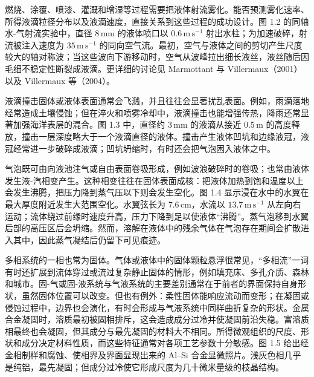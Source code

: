 \documentclass[11pt,a4paper,openany,fontset=none]{ctexbook}
\newenvironment{sourceblock}
  {\par\addvspace{0.65\baselineskip}\noindent\begin{minipage}{\linewidth}\centering}
  {\end{minipage}\par\addvspace{0.48\baselineskip}}
\begin{document}
燃烧、涂覆、喷漆、灌溉和增湿等过程需要把液体射流雾化。能否预测雾化速率、所得液滴粒径分布以及液滴速度，直接关系到这些过程的成功设计。图 1.2 的同轴水-气射流实验中，直径 $8\,\mathrm{mm}$ 的液体喷口以 $0.6\,\mathrm{m\,s^{-1}}$ 射出水柱；为加速破碎，射流被注入速度为 $35\,\mathrm{m\,s^{-1}}$ 的同向空气流。最初，空气与液体之间的剪切产生尺度较大的轴对称波；当这些波向下游移动时，空气从波峰拉出细长液丝，液丝随后因毛细不稳定性断裂成液滴。更详细的讨论见 Marmottant 与 Villermaux（2001）以及 Villermaux 等（2004）。

\begin{sourceblock}
\end{sourceblock}

液滴撞击固体或液体表面通常会飞溅，并且往往会显著扰乱表面。例如，雨滴落地经常造成土壤侵蚀；但在淬火和喷雾冷却中，液滴撞击也能增强传热，降雨还常显著加强海洋表层的混合。图 1.3 中，直径约 $3\,\mathrm{mm}$ 的液滴从接近 $0.5\,\mathrm{m}$ 的高度释放，撞击一层深度略大于一个液滴直径的液体。撞击产生液体凹坑和边缘液冠，液冠经常进一步破碎成液滴；凹坑坍缩时，有时还会把气泡困入液体之中。

\begin{sourceblock}
\end{sourceblock}

气泡既可由向液池注气或自由表面卷吸形成，例如波浪破碎时的卷吸；也常由液体发生液-汽相变产生。这种相变往往在固体表面成核：把液体加热到饱和温度以上会发生沸腾，把压力降到蒸气压以下则会发生空化。图 1.4 显示浸在水中的水翼在最大厚度附近发生大范围空化。水翼弦长为 $7.6\,\mathrm{cm}$，水流以 $13.7\,\mathrm{m\,s^{-1}}$ 从左向右运动；流体绕过前缘时速度升高，压力下降到足以使液体“沸腾”。蒸气泡移到水翼后部的高压区后会坍缩。然而，溶解在液体中的残余气体在气泡存在期间会扩散进入其中，因此蒸气凝结后仍留下可见痕迹。

\begin{sourceblock}
\end{sourceblock}

多相系统的一相也常为固体。气体或液体中的固体颗粒悬浮很常见，“多相流”一词有时还扩展到流体穿过或流过复杂静止固体的情形，例如填充床、多孔介质、森林和城市。固-气或固-液系统与气液系统的主要差别通常在于前者的界面保持自身形状，虽然固体位置可以改变。但也有例外：柔性固体能响应流动而变形；在凝固或侵蚀过程中，边界也会演化，有时会形成与气液系统中同样曲折复杂的形状。金属合金凝固时，溶质最初被固相排斥，这会造成成分过冷并使凝固前沿失稳。富溶质相最终也会凝固，但其成分与最先凝固的材料大不相同。所得微观组织的尺度、形状和成分决定材料性质，而这些特征通常对各项工艺参数十分敏感。图 1.5 给出经金相制样和腐蚀、使相界及界面显现出来的 Al--Si 合金显微照片。浅灰色相几乎是纯铝，最先凝固；但成分过冷使它形成尺度为几十微米量级的枝晶结构。
\end{document}
